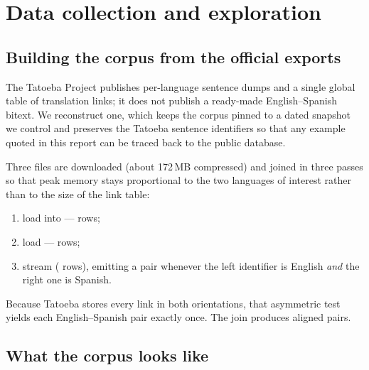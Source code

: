 \documentclass[11pt,a4paper]{article}
\begin{document}
\section{Data collection and exploration}
\label{sec:data}

\subsection{Building the corpus from the official exports}

The Tatoeba Project publishes per-language sentence dumps and a single global
table of translation links; it does not publish a ready-made English--Spanish
bitext. We reconstruct one, which keeps the corpus pinned to a dated snapshot
we control and preserves the Tatoeba sentence identifiers so that any example
quoted in this report can be traced back to the public database.

Three files are downloaded (about 172\,MB compressed) and joined in three
passes so that peak memory stays proportional to the two languages of interest
rather than to the size of the link table:

\begin{enumerate}
  \item load  into  ---
    \TatoebaEnglishSentences{} rows;
  \item load  --- \TatoebaSpanishSentences{} rows;
  \item stream  (\TatoebaLinksScanned{} rows), emitting a pair
    whenever the left identifier is English \emph{and} the right one is
    Spanish.
\end{enumerate}

Because Tatoeba stores every link in both orientations, that asymmetric test
yields each English--Spanish pair exactly once. The join produces
\PairsRaw{} aligned pairs.


\subsection{What the corpus looks like}
\end{document}

